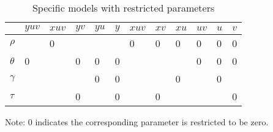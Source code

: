 \begin{table}[htbp]
	
	\centering
	
	\caption{Specific  models with restricted parameters}
	
	\label{Tab01}
	\begin{threeparttable}
	\begin{tabular}{@{}llllllllllll@{}}
		\toprule
		 & $yuv$ & $xuv$ & $yv$ & $yu$ & $y$ & $xuv$ & $xv$ & $xu$ & $uv$ & $u$ & $v$  \\ \midrule
		$\rho$   &     & 0   &    &    &   & 0   & 0  & 0  & 0  & 0 & 0 \\
		$\theta$ & 0   &     & 0  & 0  & 0 &     &    &    & 0  & 0 & 0 \\
		$\gamma$ &     &     &    & 0  & 0 &     &    & 0  &    & 0 &   \\
		$\tau$   &     &     & 0  &    & 0 &     & 0  &    &    &   & 0 \\ \bottomrule
	\end{tabular}
	\begin{tablenotes}
		\footnotesize
		\item Note: 0 indicates the corresponding parameter is restricted to be zero.
	\end{tablenotes}
\end{threeparttable}
\end{table}



\endinput
